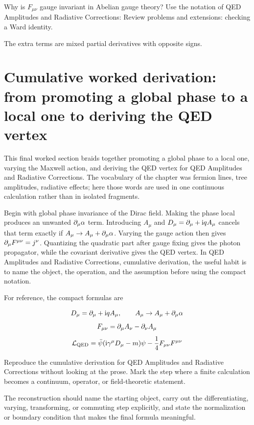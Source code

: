 \begin{exercise}
Why is \(F_{\mu\nu}\) gauge invariant in Abelian gauge theory?  Use the notation of QED Amplitudes and Radiative Corrections: Review problems and extensions: checking a Ward identity.
\begin{answer}
The extra terms are mixed partial derivatives with opposite signs.
\end{answer}
\end{exercise}



\section{Cumulative worked derivation: from promoting a global phase to a local one to deriving the QED vertex}

This final worked section braids together promoting a global phase to a local one, varying the Maxwell action, and deriving the QED vertex for QED Amplitudes and Radiative Corrections.  The vocabulary of the chapter was fermion lines, tree amplitudes, radiative effects; here those words are used in one continuous calculation rather than in isolated fragments.

Begin with global phase invariance of the Dirac field.  Making the phase local produces an unwanted \(\partial_\mu\alpha\) term.  Introducing \(A_\mu\) and \(D_\mu=\partial_\mu+\mathrm i qA_\mu\) cancels that term exactly if \(A_\mu\to A_\mu+\partial_\mu\alpha\).  Varying the gauge action then gives \(\partial_\mu F^{\mu\nu}=j^\nu\).  Quantizing the quadratic part after gauge fixing gives the photon propagator, while the covariant derivative gives the QED vertex.  In QED Amplitudes and Radiative Corrections, cumulative derivation, the useful habit is to name the object, the operation, and the assumption before using the compact notation.

For reference, the compact formulas are

\[
  D_\mu=\partial_\mu+\mathrm i qA_\mu,\qquad A_\mu\to A_\mu+\partial_\mu\alpha
\]
\[
  F_{\mu\nu}=\partial_\mu A_\nu-\partial_\nu A_\mu
\]
\[
  \mathcal L_{\mathrm{QED}}=\bar\psi(\mathrm i\gamma^\mu D_\mu-m)\psi-\frac14F_{\mu\nu}F^{\mu\nu}
\]

\begin{exercise}
Reproduce the cumulative derivation for QED Amplitudes and Radiative Corrections without looking at the prose.  Mark the step where a finite calculation becomes a continuum, operator, or field-theoretic statement.
\begin{answer}
The reconstruction should name the starting object, carry out the differentiating, varying, transforming, or commuting step explicitly, and state the normalization or boundary condition that makes the final formula meaningful.
\end{answer}
\end{exercise}



